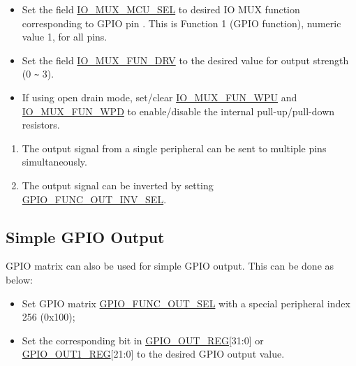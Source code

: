\documentclass[main\_\_EN.tex]{subfiles}
\begin{document}
\begin{enumerate}
    \begin{itemize}
        \item Set the field \hyperref[fielddesc:IOMUXMCUSEL]{IO\_MUX\_MCU\_SEL} to desired IO MUX function corresponding to GPIO pin . This is Function 1 (GPIO function), numeric value 1, for all pins.
        \item Set the field \hyperref[fielddesc:IOMUXFUNDRV]{IO\_MUX\_FUN\_DRV} to the desired value for output strength (0 \verb+~+ 3).
        \item If using open drain mode, set/clear \hyperref[fielddesc:IOMUXFUNWPU]{IO\_MUX\_FUN\_WPU} and \hyperref[fielddesc:IOMUXFUNWPD]{IO\_MUX\_FUN\_WPD} to enable/disable the internal pull-up/pull-down resistors.
    \end{itemize}
\end{enumerate}

\begin{tiplisting}
\vspace{-2em}
\begin{enumerate}
\item \label{output-note-1} The output signal from a single peripheral can be sent to multiple pins simultaneously.
\item \label{output-note-3} The output signal can be inverted by setting \hyperref[fielddesc:GPIOFUNCNOUTINVSEL]{GPIO\_FUNC\_OUT\_INV\_SEL}.
\end{enumerate}
\end{tiplisting}

\subsection{Simple GPIO Output}

GPIO matrix can also be used for simple GPIO output. This can be done as below:

\begin{itemize}
    \item Set GPIO matrix \hyperref[fielddesc:GPIOFUNCNOUTSEL]{GPIO\_FUNC\_OUT\_SEL} with a special peripheral index 256 (0x{}100);
    \item Set the corresponding bit in \hyperref[regdesc:GPIOOUTREG]{GPIO\_OUT\_REG}[31:0] or \hyperref[regdesc:GPIOOUT1REG]{GPIO\_OUT1\_REG}[21:0] to the desired GPIO output value.
\end{itemize}
\end{document}
